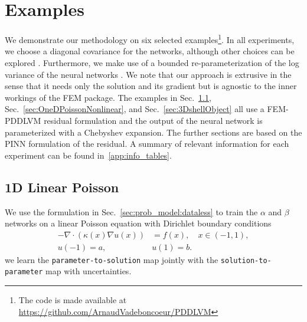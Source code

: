 \documentclass[11pt, fleqn]{article}
\begin{document}
\section{Examples}\label{sec:experiments}
%
We demonstrate our methodology on six selected examples\footnote{The code is made available at  \href{https://github.com/ArnaudVadeboncoeur/PDDLVM}{https://github.com/ArnaudVadeboncoeur/PDDLVM}}. In all experiments, we choose a diagonal covariance for the networks, although other choices can be explored \cite{kingma2019introduction}. Furthermore, we make use of a bounded re-parameterization of the log variance of the neural networks \cite{dehaene2021re}. We note that our approach is extrusive in the sense that it needs only the solution and its gradient but is agnostic to the inner workings of the \gls*{FEM} package.  The examples in Sec.~\ref{sec:LinearPoisson}, Sec.~\ref{sec:OneDPoissonNonlinear}, and Sec.~\ref{sec:3DshellObject} all use a \gls*{FEM}-\gls*{PDDLVM} residual formulation and the output of the neural network is parameterized with a Chebyshev expansion. The further sections are based on the \gls*{PINN} formulation of the residual. A summary of relevant information for each experiment can be found in~\ref{app:info_tables}. 

\subsection{1D Linear Poisson}\label{sec:LinearPoisson}
%
We use the formulation in Sec.~\ref{sec:prob_model:dataless} to train the $\alpha$ and $\beta$ networks on a linear Poisson equation with Dirichlet boundary conditions 
\begin{align}
   -\nabla\cdot(\kappa(x)\nabla u(x)) &= f(x), \quad x\in (-1,1),
   \label{eq:LinearPoisson} \\
   u(-1) = a, \quad & u(1) = b. \nonumber
\end{align}
we learn the \texttt{parameter-to-solution} map jointly with the \texttt{solution-to-parameter} map with uncertainties.
\end{document}

